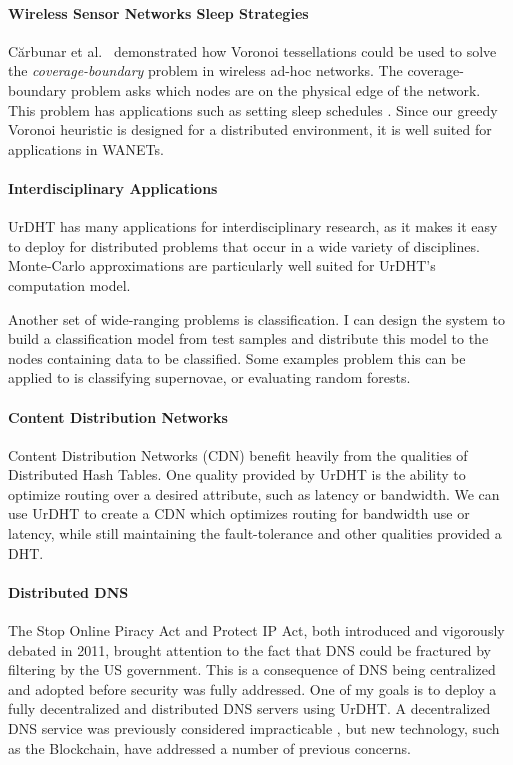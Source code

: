 \documentclass[letterpaper]{article}
\begin{document}
\paragraph*{Wireless Sensor Networks Sleep Strategies} C\u{a}rbunar et al.\ \cite{carbunar2004distributed} demonstrated how Voronoi tessellations could be used to solve the \textit{coverage-boundary} problem in wireless ad-hoc networks.
The coverage-boundary problem asks which nodes are on the physical edge of the network.
This problem  has applications such as setting sleep schedules \cite{chen2008voronoi}.
Since our greedy Voronoi heuristic is designed for a distributed environment, it is well suited for applications in WANETs. 


\paragraph*{Interdisciplinary Applications}
UrDHT has many applications for interdisciplinary research, as it makes it easy to deploy for distributed problems that occur in a wide variety of disciplines.
Monte-Carlo approximations are particularly well suited for UrDHT's computation model.

Another set of wide-ranging problems is classification.  
I can design the system to build a classification model from test samples and distribute this model to the nodes containing data to be classified.
Some examples problem this can be applied to is classifying supernovae, or evaluating random forests.


\paragraph*{Content Distribution Networks}
Content Distribution Networks (CDN) benefit heavily from the qualities of Distributed Hash Tables.
One quality provided by UrDHT is the ability to optimize routing over a desired attribute, such as latency or bandwidth.
We can use UrDHT to create a CDN which optimizes routing for bandwidth use or latency, while still maintaining the fault-tolerance and other qualities provided a DHT.


\paragraph*{Distributed DNS}
The Stop Online Piracy Act and Protect IP Act, both introduced and vigorously debated in 2011, brought attention to the fact that DNS could be fractured by filtering by the US government.
This is a consequence of DNS being centralized  and adopted before security was fully addressed.
One of my goals is to deploy a fully decentralized and distributed DNS servers using UrDHT.
A decentralized DNS service was previously considered impracticable \cite{cox2002serving}, but new technology, such as the Blockchain, have addressed a number of previous concerns.
\end{document}
